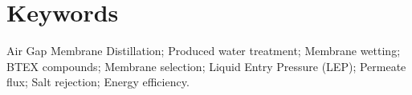 \begin{abstract}

Insert abstract here.

\end{abstract}


\section*{Keywords}

Air Gap Membrane Distillation;
Produced water treatment;
Membrane wetting;
BTEX compounds;
Membrane selection;
Liquid Entry Pressure (LEP);
Permeate flux;
Salt rejection;
Energy efficiency.